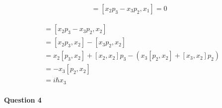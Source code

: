 \documentclass[11pt,a4paper]{article}
\begin{document}
\begin{enumerate}
\begin{align}
    [L_1,x_1]=[x_2p_3-x_3p_2,x_1]=0
\end{align}

\begin{align}
    [L_1,x_2]
    &=[x_2p_3-x_3p_2,x_2]\\
    &=[x_2p_3,x_2]-[x_3p_2,x_2]\\
    &=x_2[p_3,x_2]+[x_2,x_2]p_3-(x_3[p_2,x_2]+[x_3,x_2]p_2)\\
    &=-x_3[p_2,x_2]\\
    &=i\hbar x_3
\end{align}

\end{enumerate}

\newpage

\paragraph{Question 4}
\end{document}
